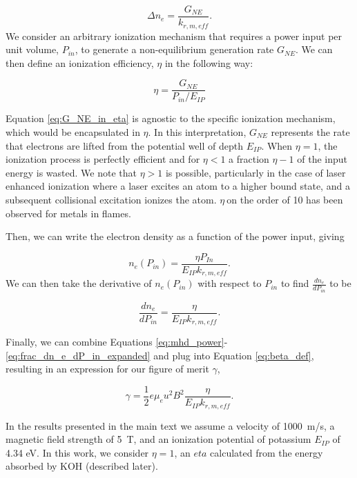 \begin{equation}
\Delta n_{e} = \frac{G_{NE}}{k_{r, m, eff}}.
\end{equation}
We consider an arbitrary ionization mechanism that requires a power input per unit volume, \(P_{in}\), to generate a non-equilibrium generation rate \(G_{NE}\). We can then define an ionization efficiency, \(\eta\) in the following way: 

\begin{equation}
\eta = \frac{G_{NE}}{P_{in}/E_{IP}}
\label{eq:G_NE_in_eta}
\end{equation}

Equation \ref{eq:G_NE_in_eta} is agnostic to the specific ionization mechanism, which would be encapsulated in \(\eta\). In this interpretation, \(G_{NE}\) represents the rate that electrons are lifted from the potential well of depth \(E_{IP}\). When \(\eta = 1\), the ionization process is perfectly efficient and for \(\eta < 1\) a fraction \(\eta - 1\) of the input energy is wasted. We note that \(\eta > 1\) is possible, particularly in the case of laser enhanced ionization where a laser excites an atom to a higher bound state, and a subsequent collisional excitation ionizes the atom. \(\eta\ \)on the order of 10 has been observed for metals in flames.\cite{turkOpticalDetectionLaserInduced1986}

Then, we can write the electron density as a function of the power input, giving

\begin{equation}
n_{e}(P_{in}) = \frac{\eta P_{In}}{E_{IP}k_{r, m, eff}}.
\end{equation}
We can then take the derivative of $n_{e}(P_{in})$ with respect to $P_{in}$ to find $\frac{dn_{e}}{dP_{in}}$ to be

\begin{equation}
\frac{dn_{e}}{dP_{in}} = \frac{\eta}{E_{IP}k_{r, m, eff}}.
\label{eq:frac_dn_e_dP_in_expanded}
\end{equation}

Finally, we can combine Equations \ref{eq:mhd_power}-\ref{eq:frac_dn_e_dP_in_expanded} and plug into Equation \ref{eq:beta_def}, resulting in an expression for our figure of merit $\gamma$,

\begin{equation}
  \label{eq:gamma-final}
\gamma = \frac{1}{2} e \mu_e u^2 B^2 \frac{\eta}{E_{IP}k_{r, m, eff}}.
\end{equation}

In the results presented in the main text we assume a velocity of \SI{1000}{\meter/\second}, a magnetic field strength of \SI{5}{\tesla}, and an ionization potential of potassium $E_{IP}$ of 4.34 eV. In this work, we consider $\eta = 1$, an $eta$ calculated from the energy absorbed by KOH (described later). 

